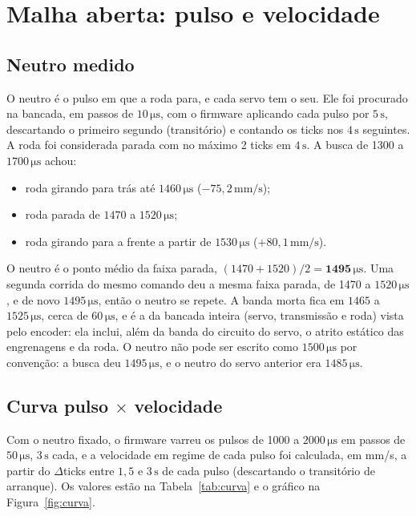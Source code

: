 \documentclass[11pt,a4paper]{article}
\newcommand{\unid}[1]{\,\mathrm{#1}}
\begin{document}
\section{Malha aberta: pulso e velocidade}
\label{sec:aberta}

\subsection{Neutro medido}

O neutro é o pulso em que a roda para, e cada servo tem o seu. Ele foi procurado na bancada, em passos de $10\unid{\mu s}$, com o firmware aplicando cada pulso por $5\unid{s}$, descartando o primeiro segundo (transitório) e contando os ticks nos $4\unid{s}$ seguintes. A roda foi considerada parada com no máximo 2 ticks em $4\unid{s}$. A busca de 1300 a $1700\unid{\mu s}$ achou:
\begin{itemize}[nosep]
  \item roda girando para trás até $1460\unid{\mu s}$ ($-75{,}2\unid{mm/s}$);
  \item roda parada de $1470$ a $1520\unid{\mu s}$;
  \item roda girando para a frente a partir de $1530\unid{\mu s}$ ($+80{,}1\unid{mm/s}$).
\end{itemize}
O neutro é o ponto médio da faixa parada, $(1470 + 1520)/2 = \mathbf{1495\unid{\mu s}}$. Uma segunda corrida do mesmo comando deu a mesma faixa parada, de 1470 a $1520\unid{\mu s}$, e de novo $1495\unid{\mu s}$, então o neutro se repete. A banda morta fica em $1465$ a $1525\unid{\mu s}$, cerca de $60\unid{\mu s}$, e é a da bancada inteira (servo, transmissão e roda) vista pelo encoder: ela inclui, além da banda do circuito do servo, o atrito estático das engrenagens e da roda. O neutro não pode ser escrito como $1500\unid{\mu s}$ por convenção: a busca deu $1495\unid{\mu s}$, e o neutro do servo anterior era $1485\unid{\mu s}$.

\subsection{Curva pulso $\times$ velocidade}

Com o neutro fixado, o firmware varreu os pulsos de 1000 a $2000\unid{\mu s}$ em passos de $50\unid{\mu s}$, $3\unid{s}$ cada, e a velocidade em regime de cada pulso foi calculada, em mm/s, a partir do $\Delta$ticks entre $1{,}5$ e $3\unid{s}$ de cada pulso (descartando o transitório de arranque). Os valores estão na Tabela~\ref{tab:curva} e o gráfico na Figura~\ref{fig:curva}.
\end{document}
